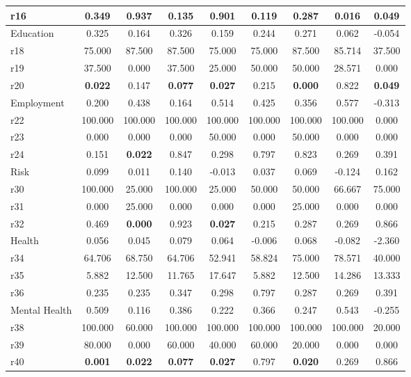 \begin{tabular}{lcccccccc}
r16 &     0.349 &     0.937 &     0.135 &     0.901 &     0.119 &     0.287 &      \textbf{0.016} &      \textbf{0.049} \\
\midrule  
Education &     0.325 &     0.164 &     0.326 &     0.159 &     0.244 &     0.271 &     0.062 &    -0.054 \\  
r18 &    75.000 &    87.500 &    87.500 &    75.000 &    75.000 &    87.500 &    85.714 &    37.500 \\  
r19 &    37.500 &     0.000 &    37.500 &    25.000 &    50.000 &    50.000 &    28.571 &     0.000 \\  
r20 &      \textbf{0.022} &     0.147 &      \textbf{0.077} &      \textbf{0.027} &     0.215 &      \textbf{0.000} &     0.822 &      \textbf{0.049} \\
\midrule  
Employment &     0.200 &     0.438 &     0.164 &     0.514 &     0.425 &     0.356 &     0.577 &    -0.313 \\  
r22 &   100.000 &   100.000 &   100.000 &   100.000 &   100.000 &   100.000 &   100.000 &     0.000 \\  
r23 &     0.000 &     0.000 &     0.000 &    50.000 &     0.000 &    50.000 &     0.000 &     0.000 \\  
r24 &     0.151 &      \textbf{0.022} &     0.847 &     0.298 &     0.797 &     0.823 &     0.269 &     0.391 \\  
\midrule
Risk &     0.099 &     0.011 &     0.140 &    -0.013 &     0.037 &     0.069 &    -0.124 &     0.162 \\  
r30 &   100.000 &    25.000 &   100.000 &    25.000 &    50.000 &    50.000 &    66.667 &    75.000 \\  
r31 &     0.000 &    25.000 &     0.000 &     0.000 &     0.000 &    25.000 &     0.000 &     0.000 \\  
r32 &     0.469 &      \textbf{0.000} &     0.923 &      \textbf{0.027} &     0.215 &     0.287 &     0.269 &     0.866 \\  
\midrule
Health &     0.056 &     0.045 &     0.079 &     0.064 &    -0.006 &     0.068 &    -0.082 &    -2.360 \\  
r34 &    64.706 &    68.750 &    64.706 &    52.941 &    58.824 &    75.000 &    78.571 &    40.000 \\  
r35 &     5.882 &    12.500 &    11.765 &    17.647 &     5.882 &    12.500 &    14.286 &    13.333 \\  
r36 &     0.235 &     0.235 &     0.347 &     0.298 &     0.797 &     0.287 &     0.269 &     0.391 \\  
\midrule
Mental Health &     0.509 &     0.116 &     0.386 &     0.222 &     0.366 &     0.247 &     0.543 &    -0.255 \\  
r38 &   100.000 &    60.000 &   100.000 &   100.000 &   100.000 &   100.000 &   100.000 &    20.000 \\  
r39 &    80.000 &     0.000 &    60.000 &    40.000 &    60.000 &    20.000 &     0.000 &     0.000 \\  
r40 &      \textbf{0.001} &      \textbf{0.022} &      \textbf{0.077} &      \textbf{0.027} &     0.797 &      \textbf{0.020} &     0.269 &     0.866 \\  

\bottomrule
\end{tabular}

